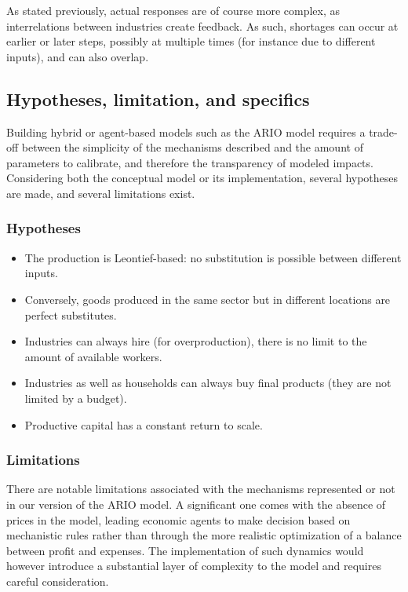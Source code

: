 As stated previously, actual responses are of course more complex, as
interrelations between industries create feedback. As such, shortages can occur
at earlier or later steps, possibly at multiple times (for instance due to
different inputs), and can also overlap.

\subsection{Hypotheses, limitation, and specifics}
\label{sec:hypotheses-lim-spec}

Building hybrid or agent-based models such as the ARIO model requires a trade-off between
the simplicity of the mechanisms described and the amount of parameters
to calibrate, and therefore the transparency of modeled impacts. Considering
both the conceptual model or its implementation, several hypotheses
are made, and several limitations exist.

\subsubsection{Hypotheses}
\label{sec:hypotheses}

\begin{itemize}
\item The production is Leontief-based: no substitution is possible between different
inputs.
\item Conversely, goods produced in the same sector but in different locations are perfect
substitutes.
\item Industries can always hire (for overproduction), there is no limit to the
  amount of available workers.
\item Industries as well as households can always buy final products (they are
  not limited by a budget).
\item Productive capital has a constant return to scale.
\end{itemize}

\subsubsection{Limitations}
\label{sec:limitations}

There are notable limitations associated with the mechanisms represented or not
in our version of the ARIO model. A significant one comes with the absence of
prices in the model, leading economic agents to make decision based on
mechanistic rules rather than through the more realistic optimization of a
balance between profit and expenses. The implementation of such dynamics would
however introduce a substantial layer of complexity to the model and requires
careful consideration.

